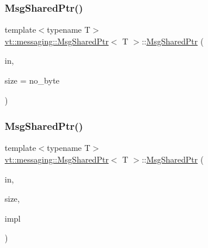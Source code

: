 \subsubsection{\texorpdfstring{Msg\+Shared\+Ptr()}{MsgSharedPtr()}\hspace{0.1cm}{\footnotesize\ttfamily [2/5]}}
{\footnotesize\ttfamily template$<$typename T$>$ \\
\hyperlink{structvt_1_1messaging_1_1_msg_shared_ptr}{vt\+::messaging\+::\+Msg\+Shared\+Ptr}$<$ T $>$\+::\hyperlink{structvt_1_1messaging_1_1_msg_shared_ptr}{Msg\+Shared\+Ptr} (\begin{DoxyParamCaption}\item[{T $\ast$}]{in,  }\item[{\hyperlink{namespacevt_aab8d55968084610ce3b17057981e9300}{Byte\+Type}}]{size = {\ttfamily no\+\_\+byte} }\end{DoxyParamCaption})\hspace{0.3cm}{\ttfamily [inline]}}

\mbox{\label{structvt_1_1messaging_1_1_msg_shared_ptr_afd1eeed56746b0a56aef23b5ba8cf31f}} 
\subsubsection{\texorpdfstring{Msg\+Shared\+Ptr()}{MsgSharedPtr()}\hspace{0.1cm}{\footnotesize\ttfamily [3/5]}}
{\footnotesize\ttfamily template$<$typename T$>$ \\
\hyperlink{structvt_1_1messaging_1_1_msg_shared_ptr}{vt\+::messaging\+::\+Msg\+Shared\+Ptr}$<$ T $>$\+::\hyperlink{structvt_1_1messaging_1_1_msg_shared_ptr}{Msg\+Shared\+Ptr} (\begin{DoxyParamCaption}\item[{T $\ast$}]{in,  }\item[{\hyperlink{namespacevt_aab8d55968084610ce3b17057981e9300}{Byte\+Type}}]{size,  }\item[{\hyperlink{structvt_1_1messaging_1_1_msg_ptr_impl_base}{Msg\+Ptr\+Impl\+Base} $\ast$}]{impl }\end{DoxyParamCaption})\hspace{0.3cm}{\ttfamily [inline]}}

